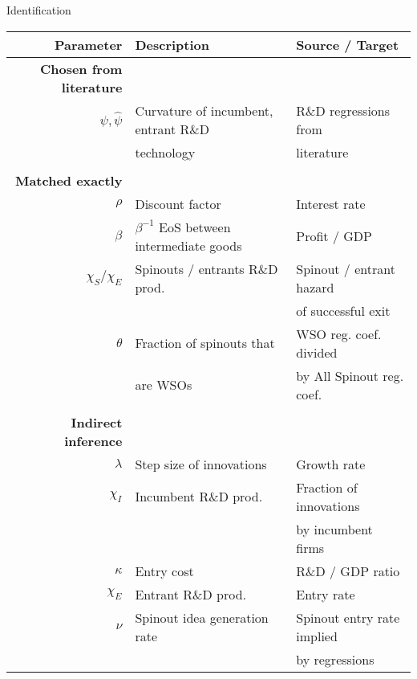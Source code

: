 \documentclass[english,usenames,dvipsnames]{beamer}
\begin{document}
\begin{frame}{Identification}
\begin{table}
	\tiny
	\centering
	\begin{tabular}{rll}
		Parameter &  Description & Source / Target\\
		\midrule
		\textbf{Chosen from literature}& \\
		$\psi, \hat{\psi}$ & Curvature of incumbent, entrant R\&D & R\&D regressions from \\
		& technology & literature\\
		& & \\
		\textbf{Matched exactly}&  \\
		$\rho$ & Discount factor & Interest rate \\
		$\beta$ & $\beta^{-1}$ EoS between intermediate goods & Profit / GDP \\
		$\chi_S / \chi_E$ & Spinouts / entrants R\&D prod. & Spinout / entrant hazard \\
		& & of successful exit \\
		$\theta$ & Fraction of spinouts that & WSO reg. coef. divided \\
		& are WSOs & by All Spinout reg. coef. \\
		& \\
		\textbf{Indirect inference}& \\
		$\lambda$ & Step size of innovations & Growth rate \\
		$\chi_I$ & Incumbent R\&D prod. & Fraction of innovations \\
		& &  by incumbent firms \\
		$\kappa$ & Entry cost & R\&D / GDP ratio\\
		$\chi_E$ & Entrant R\&D prod. & Entry rate \\
		$\nu$ & Spinout idea generation rate & Spinout entry rate implied \\
		& & by regressions \\
		\bottomrule
	\end{tabular}
\end{table}
\end{frame}
\end{document}
